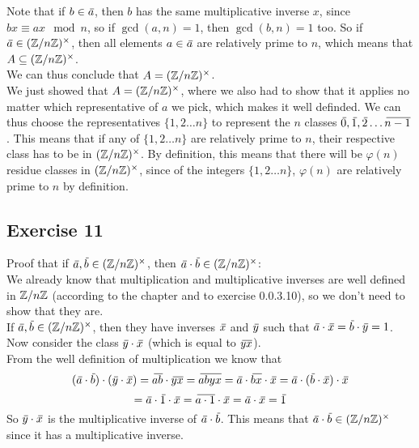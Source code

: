 \documentclass[12pt]{article}
\begin{document}
    Note that if $b \in \,\overline{\!{a}}$,
    then $b$ has the same multiplicative inverse $x$,
    since $bx \equiv ax \mod n$,
    so if $\gcd(a, n) = 1$, then $\gcd(b, n) = 1$ too.
    So if $\,\overline{\!{a}} \in (\mathbb{Z}/n\mathbb{Z})^\times$,
    then all elements $a \in \,\overline{\!{a}}$
    are relatively prime to $n$,
    which means that $A \subseteq (\mathbb{Z}/n\mathbb{Z})^\times$. \\
    We can thus conclude that $A = (\mathbb{Z}/n\mathbb{Z})^\times$. \\
    We just showed that $A = (\mathbb{Z}/n\mathbb{Z})^\times$,
    where we also had to show that it applies
    no matter which representative of $a$ we pick,
    which makes it well definded.
    We can thus choose the representatives
    $\{1, 2 \dots n \}$
    to represent
    the $n$ classes $\,\overline{\!{0}}, \,\overline{\!{1}}, \,\overline{\!{2}} \dots \,\overline{\!{n-1}}$.
    This means that if any of $\{1, 2 \dots n \}$
    are relatively prime to $n$,
    their respective class has to be in $(\mathbb{Z}/n\mathbb{Z})^\times$.
    By definition,
    this means that there will be $\varphi(n)$
    residue classes in $(\mathbb{Z}/n\mathbb{Z})^\times$,
    since of the integers $\{1, 2 \dots n \}$,
    $\varphi(n)$ are relatively prime to $n$ by definition. \\

    \subsection*{Exercise 11}
    Proof that if $\,\overline{\!{a}}, \,\overline{\!{b}} \in (\mathbb{Z}/n\mathbb{Z})^\times$,
    then $\,\overline{\!{a}} \cdot \,\overline{\!{b}} \in (\mathbb{Z}/n\mathbb{Z})^\times$: \\
    We already know that multiplication
    and multiplicative inverses are well defined in $\mathbb{Z}/n\mathbb{Z}$
    (according to the chapter and to exercise 0.0.3.10),
    so we don't need to show that they are. \\
    If $\,\overline{\!{a}}, \,\overline{\!{b}} \in (\mathbb{Z}/n\mathbb{Z})^\times$,
    then they have inverses $\,\overline{\!{x}}$ and $\,\overline{\!{y}}$
    such that $\,\overline{\!{a}} \cdot \,\overline{\!{x}} = \,\overline{\!{b}} \cdot \,\overline{\!{y}} = 1$.
    Now consider the class $\,\overline{\!{y}} \cdot \,\overline{\!{x}}$
    (which is equal to $\,\overline{\!{yx}}$). \\
    From the well definition of multiplication we know that
    \[ (\olsi{a} \cdot \olsi{b}) \cdot (\olsi{y} \cdot \olsi{x})
    = \olsi{ab} \cdot \olsi{yx}
    = \olsi{abyx}
    = \olsi{a} \cdot \olsi{bx} \cdot \olsi{x}
    = \olsi{a} \cdot (\olsi{b} \cdot \olsi{x}) \cdot \olsi{x} \]
    \[ = \olsi{a} \cdot \olsi{1} \cdot \olsi{x}
    = \olsi{a \cdot 1} \cdot \olsi{x}
    = \olsi{a} \cdot \olsi{x}
    = \olsi{1} \]
    So $\,\overline{\!{y}} \cdot \,\overline{\!{x}}$
    is the multiplicative inverse of $\,\overline{\!{a}} \cdot \,\overline{\!{b}}$.
    This means that $\,\overline{\!{a}} \cdot \,\overline{\!{b}} \in (\mathbb{Z}/n\mathbb{Z})^\times$
    since it has a multiplicative inverse. \\
\end{document}

